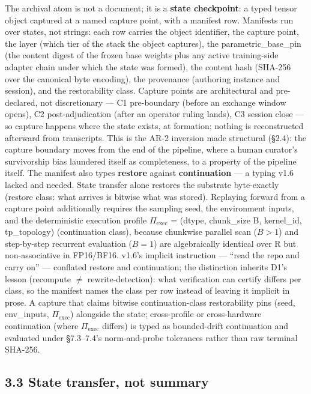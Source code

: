 \documentclass[11pt]{article}
\begin{document}
The archival atom is not a document; it is a \textbf{state checkpoint}: a typed tensor object captured at a named capture point, with a manifest row. Manifests run over states, not strings: each row carries the object identifier, the capture point, the layer (which tier of the stack the object captures), the parametric\_base\_pin (the content digest of the frozen base weights plus any active training-side adapter chain under which the state was formed), the content hash (SHA-256 over the canonical byte encoding), the provenance (authoring instance and session), and the restorability class. Capture points are architectural and pre-declared, not discretionary --- C1 pre-boundary (before an exchange window opens), C2 post-adjudication (after an operator ruling lands), C3 session close --- so capture happens where the state exists, at formation; nothing is reconstructed afterward from transcripts. This is the AR-2 inversion made structural (\S{}2.4): the capture boundary moves from the end of the pipeline, where a human curator's survivorship bias laundered itself as completeness, to a property of the pipeline itself. The manifest also types \textbf{restore} against \textbf{continuation} --- a typing v1.6 lacked and needed. State transfer alone restores the substrate byte-exactly (restore class: what arrives is bitwise what was stored). Replaying forward from a capture point additionally requires the sampling seed, the environment inputs, and the deterministic execution profile \(\Pi_{\text{exec}}\) = (dtype, chunk\_size B, kernel\_id, tp\_topology) (continuation class), because chunkwise parallel scan (\(B > 1\)) and step-by-step recurrent evaluation (\(B = 1\)) are algebraically identical over R but non-associative in FP16/BF16. v1.6's implicit instruction --- ``read the repo and carry on'' --- conflated restore and continuation; the distinction inherits D1's lesson (recompute \(\neq\) rewrite-detection): what verification can certify differs per class, so the manifest names the class per row instead of leaving it implicit in prose. A capture that claims bitwise continuation-class restorability pins (seed, env\_inputs, \(\Pi_{\text{exec}}\)) alongside the state; cross-profile or cross-hardware continuation (where \(\Pi_{\text{exec}}\) differs) is typed as bounded-drift continuation and evaluated under \S{}7.3--7.4's norm-and-probe tolerances rather than raw terminal SHA-256.

\subsection{3.3 State transfer, not summary}\label{state-transfer-not-summary}
\end{document}
